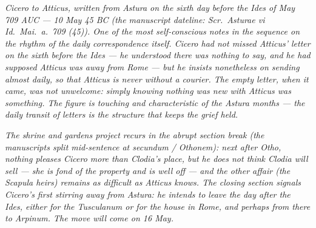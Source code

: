 
\textit{Cicero to Atticus, written from Astura on the
sixth day before the Ides of May 709 AUC --- 10 May
45 BC (the manuscript dateline: \textit{Scr.\ Asturae
vi Id.\ Mai.\ a.\ 709 (45)}). One of the most
self-conscious notes in the sequence on the rhythm
of the daily correspondence itself. Cicero had not
missed Atticus' letter on the sixth before the
Ides --- he understood there was nothing to say,
and he had supposed Atticus was away from Rome --- but
he insists nonetheless on sending almost daily, so
that Atticus is never without a courier. The empty
letter, when it came, was not unwelcome: simply
knowing nothing was new with Atticus was something.
The figure is touching and characteristic of the
Astura months --- the daily transit of letters is
the structure that keeps the grief held.}

\textit{The shrine and gardens project recurs in
the abrupt section break (the manuscripts split
mid-sentence at \textit{secundum / Othonem}): next
after Otho, nothing pleases Cicero more than
Clodia's place, but he does not think Clodia will
sell --- she is fond of the property and is well
off --- and the other affair (the Scapula heirs)
remains as difficult as Atticus knows. The closing
section signals Cicero's first stirring away from
Astura: he intends to leave the day after the
Ides, either for the Tusculanum or for the house
in Rome, and perhaps from there to Arpinum. The
move will come on 16 May.}
